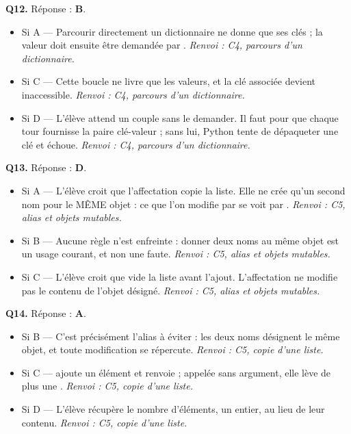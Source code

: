 \textbf{Q12.} Réponse : \textbf{B}.
\begin{itemize}[nosep]
  \item Si A — Parcourir directement un dictionnaire ne donne que ses clés ; la valeur doit ensuite être demandée par . \emph{Renvoi : C4, parcours d'un dictionnaire.}
  \item Si C — Cette boucle ne livre que les valeurs, et la clé associée devient inaccessible. \emph{Renvoi : C4, parcours d'un dictionnaire.}
  \item Si D — L'élève attend un couple sans le demander. Il faut  pour que chaque tour fournisse la paire clé-valeur ; sans lui, Python tente de dépaqueter une clé et échoue. \emph{Renvoi : C4, parcours d'un dictionnaire.}
\end{itemize}

\textbf{Q13.} Réponse : \textbf{D}.
\begin{itemize}[nosep]
  \item Si A — L'élève croit que l'affectation copie la liste. Elle ne crée qu'un second nom pour le MÊME objet : ce que l'on modifie par  se voit par . \emph{Renvoi : C5, alias et objets mutables.}
  \item Si B — Aucune règle n'est enfreinte : donner deux noms au même objet est un usage courant, et non une faute. \emph{Renvoi : C5, alias et objets mutables.}
  \item Si C — L'élève croit que  vide la liste avant l'ajout. L'affectation ne modifie pas le contenu de l'objet désigné. \emph{Renvoi : C5, alias et objets mutables.}
\end{itemize}

\textbf{Q14.} Réponse : \textbf{A}.
\begin{itemize}[nosep]
  \item Si B — C'est précisément l'alias à éviter : les deux noms désignent le même objet, et toute modification se répercute. \emph{Renvoi : C5, copie d'une liste.}
  \item Si C —  ajoute un élément et renvoie  ; appelée sans argument, elle lève de plus une . \emph{Renvoi : C5, copie d'une liste.}
  \item Si D — L'élève récupère le nombre d'éléments, un entier, au lieu de leur contenu. \emph{Renvoi : C5, copie d'une liste.}
\end{itemize}

